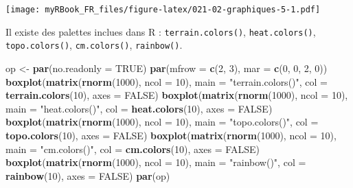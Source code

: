 \documentclass[]{book}
\newenvironment{Shaded}{\begin{snugshade}}{\end{snugshade}}
\newcommand{\DataTypeTok}[1]{\textcolor[rgb]{0.13,0.29,0.53}{#1}}
\newcommand{\DecValTok}[1]{\textcolor[rgb]{0.00,0.00,0.81}{#1}}
\newcommand{\KeywordTok}[1]{\textcolor[rgb]{0.13,0.29,0.53}{\textbf{#1}}}
\newcommand{\NormalTok}[1]{#1}
\newcommand{\OtherTok}[1]{\textcolor[rgb]{0.56,0.35,0.01}{#1}}
\newcommand{\StringTok}[1]{\textcolor[rgb]{0.31,0.60,0.02}{#1}}
\begin{document}
\texttt{[image: myRBook\_FR\_files/figure-latex/021-02-graphiques-5-1.pdf]}

Il existe des palettes inclues dans R : \texttt{terrain.colors()}, \texttt{heat.colors()}, \texttt{topo.colors()},
\texttt{cm.colors()}, \texttt{rainbow()}.

\begin{Shaded}
\begin{Highlighting}[]
\NormalTok{op <-}\StringTok{ }\KeywordTok{par}\NormalTok{(}\DataTypeTok{no.readonly =} \OtherTok{TRUE}\NormalTok{)}
\KeywordTok{par}\NormalTok{(}\DataTypeTok{mfrow =} \KeywordTok{c}\NormalTok{(}\DecValTok{2}\NormalTok{, }\DecValTok{3}\NormalTok{), }\DataTypeTok{mar =} \KeywordTok{c}\NormalTok{(}\DecValTok{0}\NormalTok{, }\DecValTok{0}\NormalTok{, }\DecValTok{2}\NormalTok{, }\DecValTok{0}\NormalTok{))}
\KeywordTok{boxplot}\NormalTok{(}\KeywordTok{matrix}\NormalTok{(}\KeywordTok{rnorm}\NormalTok{(}\DecValTok{1000}\NormalTok{), }\DataTypeTok{ncol =} \DecValTok{10}\NormalTok{), }\DataTypeTok{main =} \StringTok{"terrain.colors()"}\NormalTok{, }
  \DataTypeTok{col =} \KeywordTok{terrain.colors}\NormalTok{(}\DecValTok{10}\NormalTok{), }\DataTypeTok{axes =} \OtherTok{FALSE}\NormalTok{)}
\KeywordTok{boxplot}\NormalTok{(}\KeywordTok{matrix}\NormalTok{(}\KeywordTok{rnorm}\NormalTok{(}\DecValTok{1000}\NormalTok{), }\DataTypeTok{ncol =} \DecValTok{10}\NormalTok{), }\DataTypeTok{main =} \StringTok{"heat.colors()"}\NormalTok{, }
  \DataTypeTok{col =} \KeywordTok{heat.colors}\NormalTok{(}\DecValTok{10}\NormalTok{), }\DataTypeTok{axes =} \OtherTok{FALSE}\NormalTok{)}
\KeywordTok{boxplot}\NormalTok{(}\KeywordTok{matrix}\NormalTok{(}\KeywordTok{rnorm}\NormalTok{(}\DecValTok{1000}\NormalTok{), }\DataTypeTok{ncol =} \DecValTok{10}\NormalTok{), }\DataTypeTok{main =} \StringTok{"topo.colors()"}\NormalTok{, }
  \DataTypeTok{col =} \KeywordTok{topo.colors}\NormalTok{(}\DecValTok{10}\NormalTok{), }\DataTypeTok{axes =} \OtherTok{FALSE}\NormalTok{)}
\KeywordTok{boxplot}\NormalTok{(}\KeywordTok{matrix}\NormalTok{(}\KeywordTok{rnorm}\NormalTok{(}\DecValTok{1000}\NormalTok{), }\DataTypeTok{ncol =} \DecValTok{10}\NormalTok{), }\DataTypeTok{main =} \StringTok{"cm.colors()"}\NormalTok{, }
  \DataTypeTok{col =} \KeywordTok{cm.colors}\NormalTok{(}\DecValTok{10}\NormalTok{), }\DataTypeTok{axes =} \OtherTok{FALSE}\NormalTok{)}
\KeywordTok{boxplot}\NormalTok{(}\KeywordTok{matrix}\NormalTok{(}\KeywordTok{rnorm}\NormalTok{(}\DecValTok{1000}\NormalTok{), }\DataTypeTok{ncol =} \DecValTok{10}\NormalTok{), }\DataTypeTok{main =} \StringTok{"rainbow()"}\NormalTok{, }
  \DataTypeTok{col =} \KeywordTok{rainbow}\NormalTok{(}\DecValTok{10}\NormalTok{), }\DataTypeTok{axes =} \OtherTok{FALSE}\NormalTok{)}
\KeywordTok{par}\NormalTok{(op)}
\end{Highlighting}
\end{Shaded}
\end{document}
